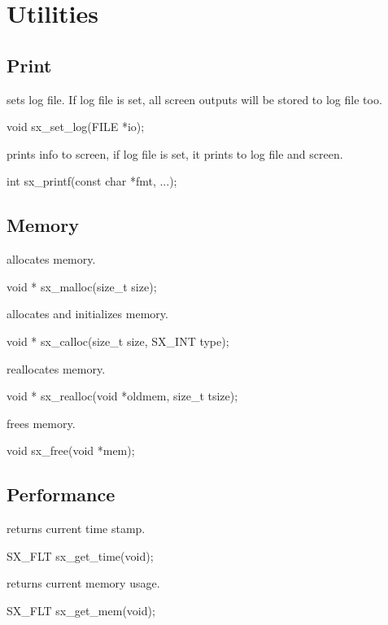 \chapter{Utilities}

\section{Print}

 sets log file. If log file is set, all screen outputs will be stored to log file too.
\begin{evb}
void sx_set_log(FILE *io);
\end{evb}

 prints info to screen, if log file is set, it prints to log file and screen.
\begin{evb}
int sx_printf(const char *fmt, ...);
\end{evb}

\section{Memory}

 allocates memory.
\begin{evb}
void * sx_malloc(size_t size);
\end{evb}

 allocates and initializes memory.
\begin{evb}
void * sx_calloc(size_t size, SX_INT type);
\end{evb}

 reallocates memory.
\begin{evb}
void * sx_realloc(void *oldmem, size_t tsize);
\end{evb}

 frees memory.
\begin{evb}
void sx_free(void *mem);
\end{evb}

\section{Performance}

 returns current time stamp.
\begin{evb}
SX_FLT sx_get_time(void);
\end{evb}

 returns current memory usage.
\begin{evb}
SX_FLT sx_get_mem(void);
\end{evb}
